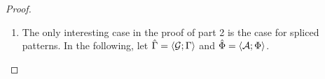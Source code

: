 {{{{\begin{proof}
\begin{enumerate}
  \item The only interesting case in the proof of part 2 is the case for spliced patterns. In the following, let $\hat\Gamma=\langle \mathcal{G}; \Gamma \rangle$ and $\hat\Phi=\langle \mathcal{A}; \Phi \rangle$.
  \begin{byCases}

\end{byCases}
\end{enumerate}
\end{proof}}}}}

